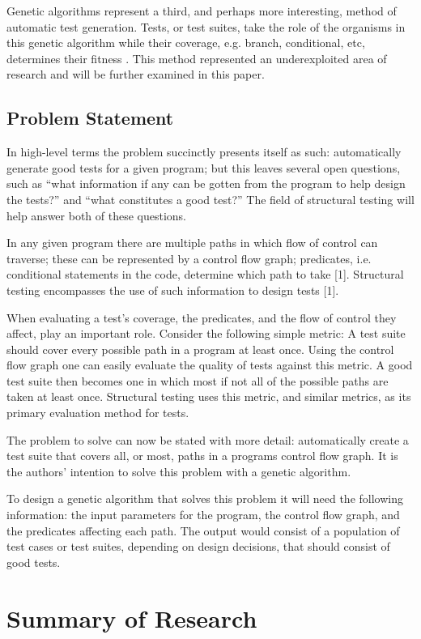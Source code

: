 \documentclass[runningheads]{llncs}
\begin{document}
Genetic algorithms represent a third, and perhaps more interesting, method of automatic test generation. Tests, or test suites, take the role of the organisms in this genetic algorithm while their coverage, e.g. branch, conditional, etc, determines their fitness \cite{sthammer4}. This method represented an underexploited area of research and will be further examined in this paper. 

\subsection{Problem Statement}
In high-level terms the problem succinctly presents itself as such: automatically generate good tests for a given program; but this leaves several open questions, such as ``what information if any can be gotten from the program to help design the tests?'' and ``what constitutes a good test?'' The field of structural testing will help answer both of these questions.

In any given program there are multiple paths in which flow of control can traverse; these can be represented by a control flow graph; predicates, i.e. conditional statements in the code, determine which path to take [1]. Structural testing encompasses the use of such information to design tests [1].

When evaluating a test's coverage, the predicates, and the flow of control they affect, play an important role. Consider the following simple metric: A test suite should cover every possible path in a program at least once. Using the control flow graph one can easily evaluate the quality of tests against this metric. A good test suite then becomes one in which most if not all of the possible paths are taken at least once. Structural testing uses this metric, and similar metrics, as its primary evaluation method for tests.

The problem to solve can now be stated with more detail: automatically create a test suite that covers all, or most, paths in a programs control flow graph. It is the authors' intention to solve this problem with a genetic algorithm. 

To design a genetic algorithm that solves this problem it will need the following information: the input parameters for the program, the control flow graph, and the predicates affecting each path. The output would consist of a population of test cases or test suites, depending on design decisions, that should consist of good tests. 

\newpage
\section{Summary of Research}
\end{document}
